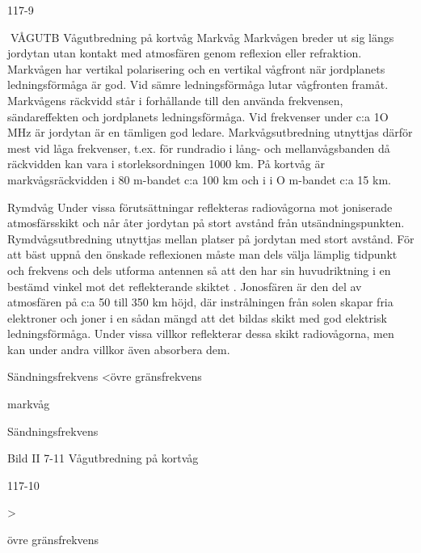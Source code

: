 \documentclass[a4paper,twoside,twocolumn,openright]{book}
\begin{document}
{{{{{117-9

VÅGUTB
Vågutbredning på kortvåg
Markvåg
Markvågen breder ut sig längs jordytan utan
kontakt med atmosfären genom reflexion
eller refraktion.
Markvågen har vertikal polarisering och
en vertikal vågfront när jordplanets ledningsförmåga är god. Vid sämre ledningsförmåga
lutar vågfronten framåt.
Markvågens räckvidd står i forhållande
till den använda frekvensen, sändareffekten
och jordplanets ledningsförmåga.
Vid frekvenser under c:a 1O MHz är jordytan är en tämligen god ledare. Markvågsutbredning utnyttjas därför mest vid låga
frekvenser, t.ex. för rundradio i lång- och
mellanvågsbanden då räckvidden kan vara
i storleksordningen 1000 km. På kortvåg är
markvågsräckvidden i 80 m-bandet c:a 100
km och i i O m-bandet c:a 15 km.

Rymdvåg
Under vissa förutsättningar reflekteras radiovågorna mot joniserade atmosfärsskikt
och når åter jordytan på stort avstånd från
utsändningspunkten. Rymdvågsutbredning
utnyttjas mellan platser på jordytan med stort
avstånd.
För att bäst uppnå den önskade reflexionen måste man dels välja lämplig tidpunkt
och frekvens och dels utforma antennen så
att den har sin huvudriktning i en bestämd
vinkel mot det reflekterande skiktet .
Jonosfären är den del av atmosfären på
c:a 50 till 350 km höjd, där instrålningen från
solen skapar fria elektroner och joner i en
sådan mängd att det bildas skikt med god
elektrisk ledningsförmåga. Under vissa villkor reflekterar dessa skikt radiovågorna, men
kan under andra villkor även absorbera dem.

Sändningsfrekvens <övre gränsfrekvens

markvåg

Sändningsfrekvens

Bild II 7-11 Vågutbredning på kortvåg

117-10

>

övre gränsfrekvens

}}}}}
\end{document}

